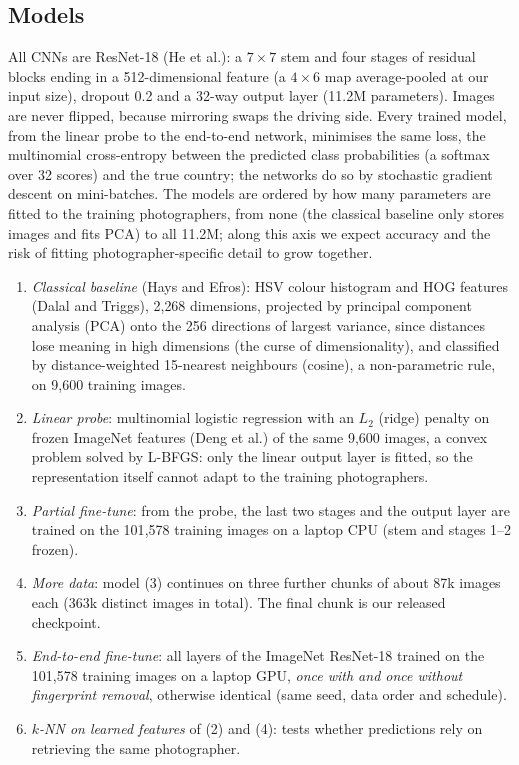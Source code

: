 \documentclass[11pt]{article}
\begin{document}
\subsection{Models}
All CNNs are ResNet-18 (He et al.): a $7\times7$ stem and four stages of residual blocks ending in a
512-dimensional feature (a $4\times6$ map average-pooled at our input size), dropout 0.2 and a 32-way
output layer (11.2M parameters). Images are never flipped, because mirroring swaps the driving side.
Every trained model, from the linear probe to the end-to-end network, minimises the same loss, the
multinomial cross-entropy between the predicted class probabilities (a softmax over 32 scores) and the true
country; the networks do so by stochastic gradient descent on mini-batches. The models are ordered by how many parameters are fitted to the training photographers, from none (the classical baseline only stores images and fits PCA) to all 11.2M; along this axis we expect accuracy and the risk of fitting photographer-specific detail to grow together.
\begin{enumerate}[label=(\arabic*),leftmargin=*]
\item \emph{Classical baseline} (Hays and Efros): HSV colour histogram and HOG features (Dalal and
Triggs), 2{,}268 dimensions, projected by principal component analysis (PCA) onto the 256 directions of
largest variance, since distances lose meaning in high dimensions (the curse of dimensionality), and
classified by distance-weighted 15-nearest neighbours (cosine), a non-parametric rule, on 9{,}600 training
images.
\item \emph{Linear probe}: multinomial logistic regression with an $L_2$ (ridge) penalty on frozen
ImageNet features (Deng et al.) of the same 9{,}600 images, a convex problem solved by L-BFGS: only the
linear output layer is fitted, so the representation itself cannot adapt to the training photographers.
\item \emph{Partial fine-tune}: from the probe, the last two stages and the output layer are trained on
the 101{,}578 training images on a laptop CPU (stem and stages 1--2 frozen).
\item \emph{More data}: model (3) continues on three further chunks of about 87k images each (363k
distinct images in total). The final chunk is our released checkpoint.
\item \emph{End-to-end fine-tune}: all layers of the ImageNet ResNet-18 trained on the 101{,}578
training images on a laptop GPU, \emph{once with and once without fingerprint removal}, otherwise
identical (same seed, data order and schedule).
\item \emph{$k$-NN on learned features} of (2) and (4): tests whether predictions rely on retrieving
the same photographer.
\end{enumerate}
\end{document}
